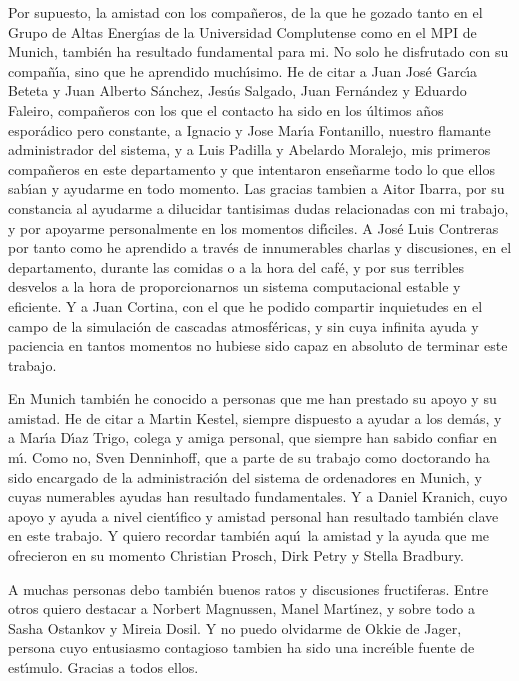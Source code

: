 Por supuesto, la amistad con los compa\~neros, de la que he gozado
tanto en el Grupo de Altas Energ\'{\i}as de la Universidad Complutense
como en el MPI de Munich, tambi\'en ha resultado fundamental para mi.
No solo he disfrutado con su compa\~n\'{\i}a, sino que he aprendido
much\'{\i}simo. He de citar a Juan Jos\'e Garc\'{\i}a Beteta y Juan
Alberto S\'anchez, Jes\'us Salgado, Juan Fern\'andez y Eduardo
Faleiro, compa\~neros con los que el contacto ha sido en los \'ultimos
a\~nos espor\'adico pero constante, a Ignacio y Jose Mar\'{\i}a
Fontanillo, nuestro flamante administrador del sistema, y a Luis
Padilla y Abelardo Moralejo, mis primeros compa\~neros en este
departamento y que intentaron ense\~narme todo lo que ellos
sab\'{\i}an y ayudarme en todo momento. Las gracias tambien a Aitor
Ibarra, por su constancia al ayudarme a dilucidar tantisimas dudas
relacionadas con mi trabajo, y por apoyarme personalmente en los
momentos dif\'{\i}ciles. A Jos\'e Luis Contreras por tanto como he
aprendido a trav\'es de innumerables charlas y discusiones, en el
departamento, durante las comidas o a la hora del caf\'e, y por sus
terribles desvelos a la hora de proporcionarnos un sistema
computacional estable y eficiente. Y a Juan Cortina, con el que he
podido compartir inquietudes en el campo de la simulaci\'on de
cascadas atmosf\'ericas, y sin cuya infinita ayuda y paciencia en
tantos momentos no hubiese sido capaz en absoluto de terminar este
trabajo.

En Munich tambi\'en he conocido a personas que me han prestado su
apoyo y su amistad. He de citar a Martin Kestel, siempre dispuesto a
ayudar a los dem\'as, y a Mar\'{\i}a D\'{\i}az Trigo, colega y amiga
personal, que siempre han sabido confiar en m\'{\i}. Como no, Sven
Denninhoff, que a parte de su trabajo como doctorando ha sido
encargado de la administraci\'on del sistema de ordenadores en Munich,
y cuyas numerables ayudas han resultado fundamentales. Y a Daniel
Kranich, cuyo apoyo y ayuda a nivel cient\'{\i}fico y amistad personal
han resultado tambi\'en clave en este trabajo.  Y quiero recordar
tambi\'en aqu\'\i\ la amistad y la ayuda que me ofrecieron en su
momento Christian Prosch, Dirk Petry y Stella Bradbury.

A muchas personas debo tambi\'en buenos ratos y discusiones
fructiferas. Entre otros quiero destacar a Norbert Magnussen, Manel
Mart\'{\i}nez, y sobre todo a Sasha Ostankov y Mireia Dosil. Y no
puedo olvidarme de Okkie de Jager, persona cuyo entusiasmo contagioso
tambien ha sido una incre\'{\i}ble fuente de est\'{\i}mulo. Gracias a
todos ellos.

